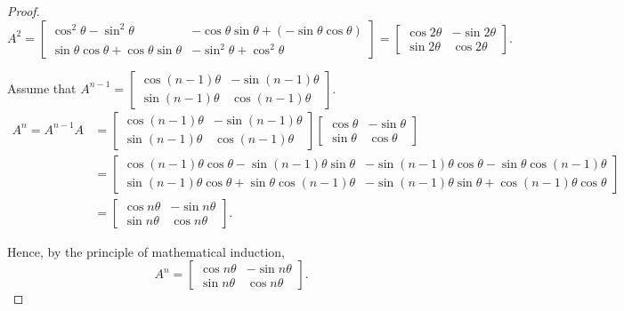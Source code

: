\begin{proof}
    \[
        A^{2} = \begin{bmatrix}
            \cos^{2}{\theta} - \sin^{2}{\theta}                 & -\cos{\theta}\sin{\theta} + (-\sin{\theta}\cos{\theta}) \\
            \sin{\theta}\cos{\theta} + \cos{\theta}\sin{\theta} & -\sin^{2}{\theta} + \cos^{2}{\theta}
        \end{bmatrix}
        = \begin{bmatrix}
            \cos{2\theta} & -\sin{2\theta} \\
            \sin{2\theta} & \cos{2\theta}
        \end{bmatrix}.
    \]

    Assume that $A^{n-1} = \begin{bmatrix}\cos{(n-1)\theta} & -\sin{(n-1)\theta} \\ \sin{(n-1)\theta} & \cos{(n-1)\theta}\end{bmatrix}$.
    \begin{align*}
        A^{n} = A^{n-1}A & = \begin{bmatrix}
                                 \cos{(n-1)\theta} & -\sin{(n-1)\theta} \\
                                 \sin{(n-1)\theta} & \cos{(n-1)\theta}
                             \end{bmatrix}
        \begin{bmatrix}
            \cos{\theta} & -\sin{\theta} \\
            \sin{\theta} & \cos{\theta}
        \end{bmatrix}                                                                                                                        \\
                         & = \begin{bmatrix}
                                 \cos{(n-1)\theta}\cos{\theta} - \sin{(n-1)\theta}\sin{\theta} & -\sin{(n-1)\theta}\cos{\theta} - \sin{\theta}\cos{(n-1)\theta} \\
                                 \sin{(n-1)\theta}\cos{\theta} + \sin{\theta}\cos{(n-1)\theta} & -\sin{(n-1)\theta}\sin{\theta} + \cos{(n-1)\theta}\cos{\theta}
                             \end{bmatrix} \\
                         & = \begin{bmatrix}
                                 \cos{n\theta} & -\sin{n\theta} \\
                                 \sin{n\theta} & \cos{n\theta}
                             \end{bmatrix}.
    \end{align*}

    Hence, by the principle of mathematical induction,
    \[
        A^{n} = \begin{bmatrix}
            \cos{n\theta} & -\sin{n\theta} \\
            \sin{n\theta} & \cos{n\theta}
        \end{bmatrix}.
    \]
\end{proof}

